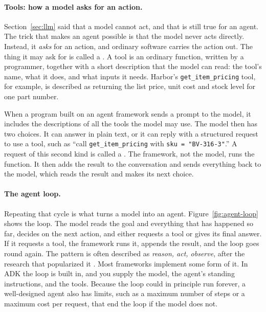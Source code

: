\paragraph{Tools: how a model asks for an action.} Section~\ref{sec:llm} said that a model cannot act, and that is still true for an agent. The trick that makes an agent possible is that the model never acts directly. Instead, it \emph{asks} for an action, and ordinary software carries the action out. The thing it may ask for is called a . A tool is an ordinary function, written by a programmer, together with a short description that the model can read: the tool's name, what it does, and what inputs it needs. Harbor's \texttt{get\_item\_pricing} tool, for example, is described as returning the list price, unit cost and stock level for one part number.

When a program built on an agent framework sends a prompt to the model, it includes the descriptions of all the tools the model may use. The model then has two choices. It can answer in plain text, or it can reply with a structured request to use a tool, such as ``call \texttt{get\_item\_pricing} with \texttt{sku = "BV-316-3"}.'' A request of this second kind is called a . The framework, not the model, runs the function. It then adds the result to the conversation and sends everything back to the model, which reads the result and makes its next choice.

\paragraph{The agent loop.} Repeating that cycle is what turns a model into an agent. Figure~\ref{fig:agent-loop} shows the loop. The model reads the goal and everything that has happened so far, decides on the next action, and either requests a tool or gives its final answer. If it requests a tool, the framework runs it, appends the result, and the loop goes round again. The pattern is often described as \emph{reason, act, observe}, after the research that popularized it \citep{yao2023react}. Most frameworks implement some form of it. In ADK the loop is built in, and you supply the model, the agent's standing instructions, and the tools. Because the loop could in principle run forever, a well-designed agent also has limits, such as a maximum number of steps or a maximum cost per request, that end the loop if the model does not.

